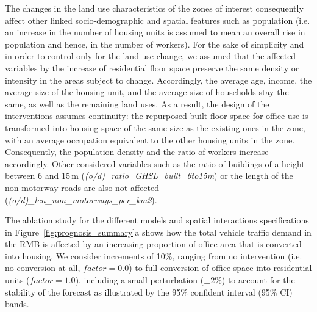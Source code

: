 The changes in the land use characteristics of the zones of interest consequently affect other linked socio-demographic and spatial features such as population (i.e. an increase in the number of housing units is assumed to mean an overall rise in population and hence, in the number of workers). For the sake of simplicity and in order to control only for the land use change, we assumed that the affected variables by the increase of residential floor space preserve the same density or intensity in the areas subject to change. Accordingly, the average age, income, the average size of the housing unit, and the average size of households stay the same, as well as the remaining land uses. As a result, the design of the interventions assumes continuity:
the repurposed built floor space for office use is transformed into housing space of the same size as the existing ones in the zone, with an average occupation equivalent to the other housing units in the zone. Consequently, the population density and the ratio of workers increase accordingly. Other considered variables such as the ratio of buildings of a height between 6 and 15\,m (\textit{(o/d)\_ratio\_GHSL\_built\_6to15m}) or the length of the non-motorway roads are also not affected (\textit{(o/d)\_len\_non\_motorways\_per\_km2}).

The ablation study for the different models and spatial interactions specifications in Figure~\ref{fig:prognosis_summary}a shows how the total vehicle traffic demand in the RMB is affected by an increasing proportion of office area that is converted into housing. We consider increments of 10\%, ranging from no intervention (i.e. no conversion at all, $\mathit{factor}=0.0$) to full conversion of office space into residential units ($\mathit{factor}=1.0$), including a small perturbation ($\pm2\%$) to account for the stability of the forecast as illustrated by the 95\% confident interval (95\% CI) bands. 

